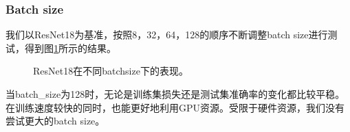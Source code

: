 \documentclass[hyperref, UTF8, 12pt]{article}
\theoremstyle{definition}
\begin{document}
\subsubsection{Batch size}
我们以ResNet18为基准，按照8，32，64，128的顺序不断调整batch size进行测试，得到图\ref{fig:resnet18_batchsize}所示的结果。
\begin{figure}[H]
	\centering
	\caption{ResNet18在不同batchsize下的表现。}
	\label{fig:resnet18_batchsize}
\end{figure}
当batch\_size为128时，无论是训练集损失还是测试集准确率的变化都比较平稳。在训练速度较快的同时，也能更好地利用GPU资源。受限于硬件资源，我们没有尝试更大的batch size。
\end{document}
